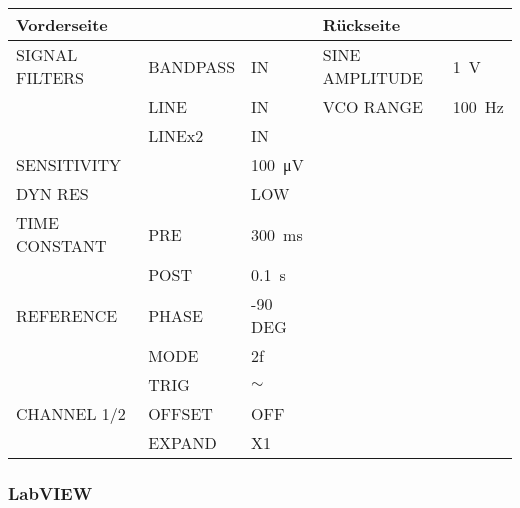 \minipage{\linewidth}
    \begin{center}
        \captionsetup{type=table}
        \begin{adjustbox}{max width=\linewidth, keepaspectratio}
            \begin{tabular}{lllll}
            \toprule
            Vorderseite    & ~        & ~                       & Rückseite      & ~                \\
            \midrule
            SIGNAL FILTERS & BANDPASS & IN                      & SINE AMPLITUDE & \SI{1}{\volt}    \\
            ~              & LINE     & IN                      & VCO RANGE      & \SI{100}{\hertz} \\
            ~              & LINEx2   & IN                      & ~              & ~                \\
            SENSITIVITY    & ~        & \SI{100}{\micro\volt}   & ~              & ~                \\
            DYN RES        & ~        & LOW                     & ~              & ~                \\
            TIME CONSTANT  & PRE      & \SI{300}{\milli\second} & ~              & ~                \\
                           & POST     & \SI{0.1}{\second}       & ~              & ~                \\
            REFERENCE      & PHASE    & -90 DEG                 & ~              & ~                \\
            ~              & MODE     & 2f                      & ~              & ~                \\
            ~              & TRIG     & $\sim$                  & ~              & ~                \\
            CHANNEL 1/2    & OFFSET   & OFF                     & ~              & ~                \\
            ~              & EXPAND   & X1                      & ~              & ~                \\
            \bottomrule
            \end{tabular}
        \end{adjustbox}
        \label{tab:EinstellungenVerstaerker}
    \end{center}
\endminipage

\subsubsection*{LabVIEW}

